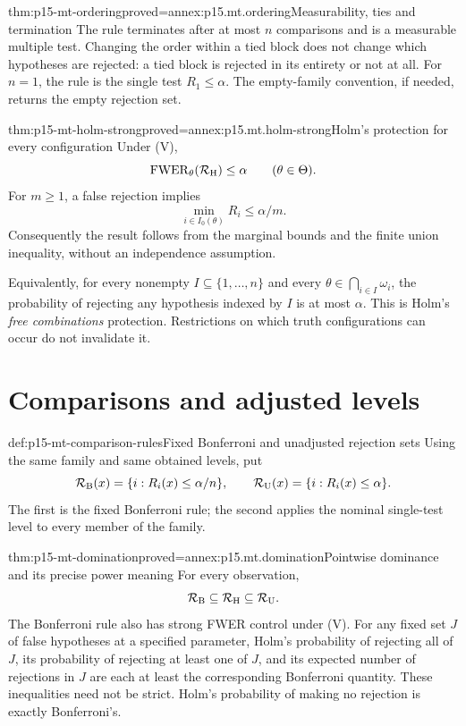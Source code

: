 \begin{hblemma}{thm:p15-mt-ordering}{proved=annex:p15.mt.ordering}{Measurability, ties and termination}
The rule terminates after at most \(n\) comparisons and is a measurable
multiple test. Changing the order within a tied block does not change
which hypotheses are rejected: a tied block is rejected in its entirety
or not at all. For \(n=1\), the rule is the single test \(R_1\leq\alpha\).
The empty-family convention, if needed, returns the empty rejection set.
\end{hblemma}

\begin{hbtheorem}{thm:p15-mt-holm-strong}{proved=annex:p15.mt.holm-strong}{Holm's protection for every configuration}
Under (V),
\[
                  \operatorname{FWER}_\theta(\mathcal R_{\rm H})
                         \leq\alpha\qquad(\theta\in\Theta).
\]
For \(m\geq1\), a false rejection implies
\[
             \min_{i\in I_0(\theta)}R_i\leq\alpha/m.
\]
Consequently the result follows from the marginal bounds and the finite
union inequality, without an independence assumption.

Equivalently, for every nonempty \(I\subseteq\{1,\ldots,n\}\) and every
\(\theta\in\bigcap_{i\in I}\omega_i\), the probability of rejecting any
hypothesis indexed by \(I\) is at most \(\alpha\). This is Holm's
\emph{free combinations} protection. Restrictions on which truth
configurations can occur do not invalidate it.
\end{hbtheorem}

\section{Comparisons and adjusted levels}
\label{sec:p15-mt-comparisons}

\begin{hbdefinition}{def:p15-mt-comparison-rules}{Fixed Bonferroni and unadjusted rejection sets}
Using the same family and same obtained levels, put
\[
 \mathcal R_{\rm B}(x)=\{i:R_i(x)\leq\alpha/n\},\qquad
 \mathcal R_{\rm U}(x)=\{i:R_i(x)\leq\alpha\}.
\]
The first is the fixed Bonferroni rule; the second applies the nominal
single-test level to every member of the family.
\end{hbdefinition}

\begin{hbtheorem}{thm:p15-mt-domination}{proved=annex:p15.mt.domination}{Pointwise dominance and its precise power meaning}
For every observation,
\[
               \mathcal R_{\rm B}\subseteq
               \mathcal R_{\rm H}\subseteq\mathcal R_{\rm U}.
\]
The Bonferroni rule also has strong FWER control under (V).
For any fixed set \(J\) of false hypotheses at a specified parameter,
Holm's probability of rejecting all of \(J\), its probability of rejecting
at least one of \(J\), and its expected number of rejections in \(J\)
are each at least the corresponding Bonferroni quantity.
These inequalities need not be strict.
Holm's probability of making no rejection is exactly Bonferroni's.
\end{hbtheorem}

